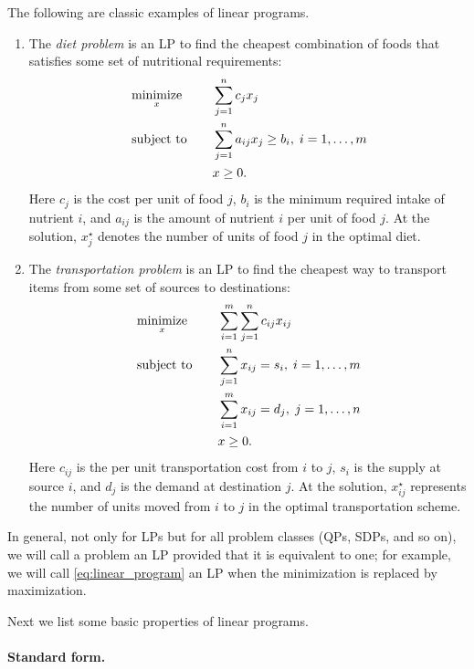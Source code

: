 \begin{Example}
The following are classic examples of linear programs. 
\begin{enumerate}[label=\alph*., ref=\alph*]
\item The \emph{diet problem} is an LP to find the cheapest combination of 
  foods that satisfies some set of nutritional requirements:
  \begin{alignat*}{2}
  &\operatorname*{minimize}_x \quad && \sum_{j=1}^n c_j x_j \\
  &\operatorname{subject\,\,to} \quad && \sum_{j=1}^n a_{ij} x_j \geq b_i, \; i=1,\dots,m \\  
  & && x \geq 0.
  \end{alignat*}
  Here $c_j$ is the cost per unit of food $j$, $b_i$ is the minimum required
  intake of nutrient $i$, and $a_{ij}$ is the amount of nutrient $i$ per unit of
  food $j$. At the solution, $x^\star_j$ denotes the number of units of food $j$
  in the optimal diet.  

\item {}
  The \emph{transportation problem} is an LP to find the cheapest way to
  transport items from some set of sources to destinations: 
  \begin{alignat*}{2}
  &\operatorname*{minimize}_x \quad && \sum_{i=1}^m \sum_{j=1}^n c_{ij} x_{ij} \\  
  &\operatorname{subject\,\,to} \quad && \sum_{j=1}^n x_{ij} = s_i, \; i=1,\dots,m \\
  & && \sum_{i=1}^m x_{ij} = d_j, \; j=1,\dots,n \\
  & && x \geq 0.
  \end{alignat*}
 Here $c_{ij}$ is the per unit transportation cost from $i$ to $j$, $s_i$ is the
 supply at source $i$, and $d_j$ is the demand at destination $j$. At the 
 solution, $x^\star_{ij}$ represents the number of units moved from $i$ to $j$
 in the optimal transportation scheme.    
\end{enumerate}
\end{Example} 

In general, not only for LPs but for all problem classes (QPs, SDPs, and so on),
we will call a problem an LP provided that it is equivalent to one; for example,
we will call \eqref{eq:linear_program} an LP when the minimization is replaced
by maximization.  

Next we list some basic properties of linear programs. 

\paragraph{Standard form.}

